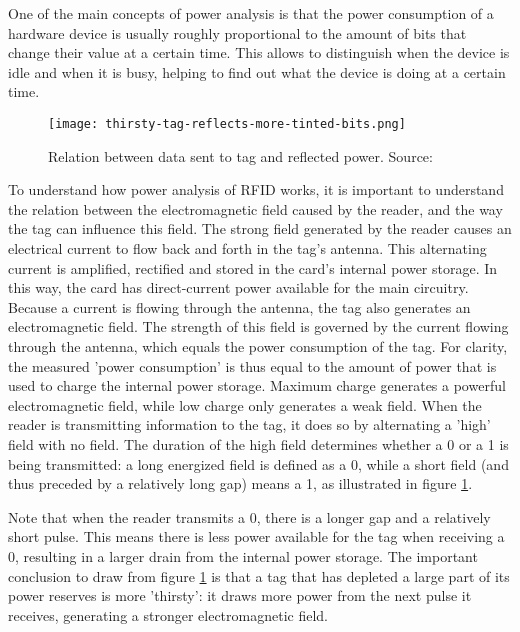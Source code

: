 \documentclass{llncs}
\begin{document}
One of the main concepts of power analysis is that the power consumption of a hardware device is usually roughly proportional to the amount of bits that change their value at a certain time. This allows to distinguish when the device is idle and when it is busy, helping to find out what the device is doing at a certain time. 

\begin{figure}[ht!]
\centering
\texttt{[image: thirsty-tag-reflects-more-tinted-bits.png]}
\caption{Relation between data sent to tag and reflected power. Source: \cite{doc:yossen-shamir_poweranalysis}}
\label{fig:thirstytag}
\end{figure}

To understand how power analysis of RFID works, it is important to understand the relation between the electromagnetic field caused by the reader, and the way the tag can influence this field. The strong field generated by the reader causes an electrical current to flow back and forth in the tag's antenna. This alternating current is amplified, rectified and stored in the card's internal power storage. In this way, the card has direct-current power available for the main circuitry. Because a current is flowing through the antenna, the tag also generates an electromagnetic field. The strength of this field is governed by the current flowing through the antenna, which equals the power consumption of the tag. For clarity, the measured 'power consumption' is thus equal to the amount of power that is used to charge the internal power storage. Maximum charge generates a powerful electromagnetic field, while low charge only generates a weak field. When the reader is transmitting information to the tag, it does so by alternating a 'high' field with no field. The duration of the high field determines whether a 0 or a 1 is being transmitted: a long energized field is defined as a 0, while a short field (and thus preceded by a relatively long gap) means a 1, as illustrated in figure \ref{fig:thirstytag}. 

Note that when the reader transmits a 0, there is a longer gap and a relatively short pulse. This means there is less power available for the tag when receiving a 0, resulting in a larger drain from the internal power storage. The important conclusion to draw from figure \ref{fig:thirstytag} is that a tag that has depleted a large part of its power reserves is more 'thirsty': it draws more power from the next pulse it receives, generating a stronger electromagnetic field. 
\end{document}
